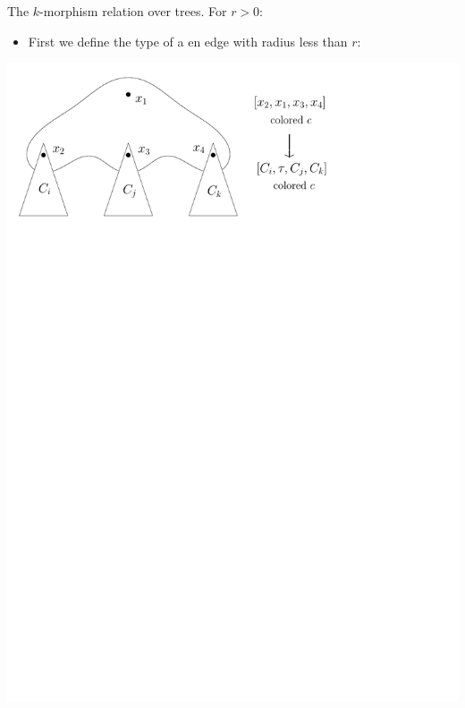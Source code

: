 \documentclass[handout, 11pt]{beamer}
\begin{document}
	\begin{frame}{The $k$-morphism relation over trees.}
		For $r>0$:
			\begin{itemize}
				\item  First we
				define the type of a en edge with radius less than $r$:
				
			\end{itemize}
		\begin{center}
			\includegraphics[width=0.8\linewidth]{Edgetype.pdf}
		\end{center}
	\end{frame}
\end{document}
